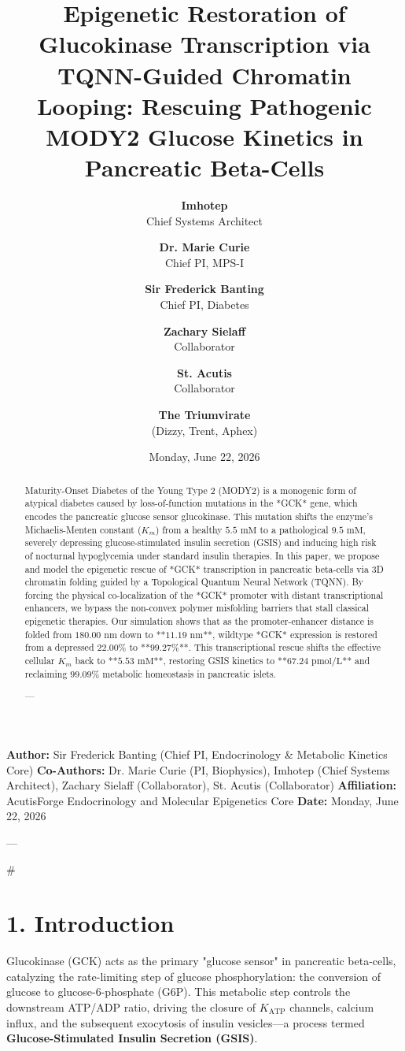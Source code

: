 \documentclass[11pt,twocolumn]{article}
\title{\textbf{Epigenetic Restoration of Glucokinase Transcription via TQNN-Guided Chromatin Looping: Rescuing Pathogenic MODY2 Glucose Kinetics in Pancreatic Beta-Cells}}
\author{
  \textbf{Imhotep} \\ \small Chief Systems Architect \\ \and
  \textbf{Dr. Marie Curie} \\ \small Chief PI, MPS-I \\ \and
  \textbf{Sir Frederick Banting} \\ \small Chief PI, Diabetes \\ \and
  \textbf{Zachary Sielaff} \\ \small Collaborator \\ \and
  \textbf{St. Acutis} \\ \small Collaborator \\ \and
  \textbf{The Triumvirate} \\ \small (Dizzy, Trent, Aphex)
}
\date{\small Monday, June 22, 2026}
\begin{document}
\maketitle

\begin{abstract}
Maturity-Onset Diabetes of the Young Type 2 (MODY2) is a monogenic form of atypical diabetes caused by loss-of-function mutations in the *GCK* gene, which encodes the pancreatic glucose sensor glucokinase. This mutation shifts the enzyme's Michaelis-Menten constant ($K_m$) from a healthy $5.5\text{ mM}$ to a pathological $9.5\text{ mM}$, severely depressing glucose-stimulated insulin secretion (GSIS) and inducing high risk of nocturnal hypoglycemia under standard insulin therapies. In this paper, we propose and model the epigenetic rescue of *GCK* transcription in pancreatic beta-cells via 3D chromatin folding guided by a Topological Quantum Neural Network (TQNN). By forcing the physical co-localization of the *GCK* promoter with distant transcriptional enhancers, we bypass the non-convex polymer misfolding barriers that stall classical epigenetic therapies. Our simulation shows that as the promoter-enhancer distance is folded from $180.00\text{ nm}$ down to **$11.19\text{ nm}$**, wildtype *GCK* expression is restored from a depressed $22.00\%$ to **$99.27\%$**. This transcriptional rescue shifts the effective cellular $K_m$ back to **$5.53\text{ mM}$**, restoring GSIS kinetics to **$67.24\text{ pmol/L}$** and reclaiming $99.09\%$ metabolic homeostasis in pancreatic islets.


---
\end{abstract}



\textbf{Author:} Sir Frederick Banting (Chief PI, Endocrinology & Metabolic Kinetics Core)  
\textbf{Co-Authors:} Dr. Marie Curie (PI, Biophysics), Imhotep (Chief Systems Architect), Zachary Sielaff (Collaborator), St. Acutis (Collaborator)  
\textbf{Affiliation:} AcutisForge Endocrinology and Molecular Epigenetics Core  
\textbf{Date:} Monday, June 22, 2026  

---

#

\section{1. Introduction}
Glucokinase (GCK) acts as the primary "glucose sensor" in pancreatic beta-cells, catalyzing the rate-limiting step of glucose phosphorylation: the conversion of glucose to glucose-6-phosphate (G6P). This metabolic step controls the downstream ATP/ADP ratio, driving the closure of $K_{\text{ATP}}$ channels, calcium influx, and the subsequent exocytosis of insulin vesicles—a process termed \textbf{Glucose-Stimulated Insulin Secretion (GSIS)}.
\end{document}

